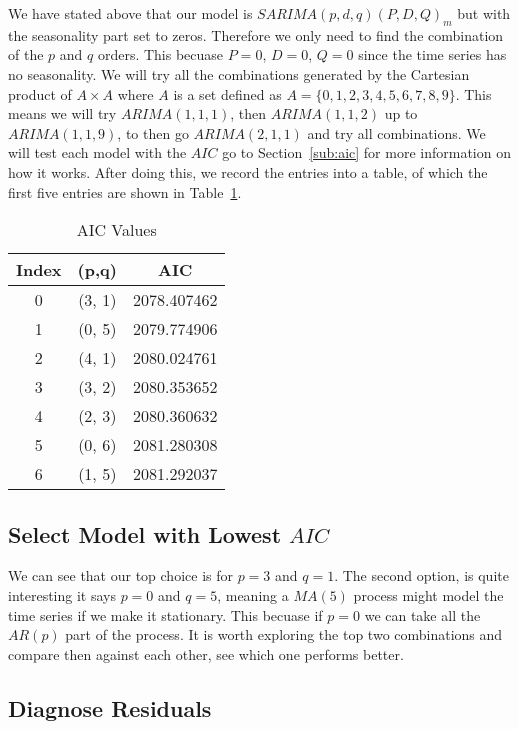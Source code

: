 \documentclass[journal]{IEEEtran}
\begin{document}
We have stated above that our model is $SARIMA(p,d,q)(P,D,Q)_m$ but with the
seasonality part set to zeros. Therefore we only need to find the combination
of the $p$ and $q$ orders. This becuase $P=0$, $D=0$, $Q=0$ since the time
series has no seasonality. We will try all the combinations generated by the
Cartesian product of $A\times A$ where $A$ is a set defined as $A =
\{0,1,2,3,4,5,6,7,8,9\}$. This means we will try $ARIMA(1,1,1)$, then
$ARIMA(1,1,2)$ up to $ARIMA(1,1,9)$, to then go $ARIMA(2,1,1)$ and try all
combinations. We will test each model with the $AIC$ go to
Section~\ref{sub:aic} for more information on how it works. After doing this,
we record the entries into a table, of which the first five entries are shown in
Table~\ref{tab:aic}.

\begin{table}[htbp]
  \centering
  \caption{AIC Values}
  \label{tab:aic}
  \begin{tabular}{|c|c|c|}
    \hline
    Index & (p,q) & AIC \\
    \hline
    0 & (3, 1) & 2078.407462 \\
    1 & (0, 5) & 2079.774906 \\
    2 & (4, 1) & 2080.024761 \\
    3 & (3, 2) & 2080.353652 \\
    4 & (2, 3) & 2080.360632 \\
    5 & (0, 6) & 2081.280308 \\
    6 & (1, 5) & 2081.292037 \\
    \hline
  \end{tabular}
\end{table}

\subsection{Select Model with Lowest $AIC$}

We can see that our top choice is for $p=3$ and $q=1$. The second option, is
quite interesting it says $p=0$ and $q=5$, meaning a $MA(5)$ process might
model the time series if we make it stationary. This becuase if $p=0$ we can
take all the $AR(p)$ part of the process. It is worth exploring the top two
combinations and compare then against each other, see which one performs
better.

\subsection{Diagnose Residuals}
\end{document}
